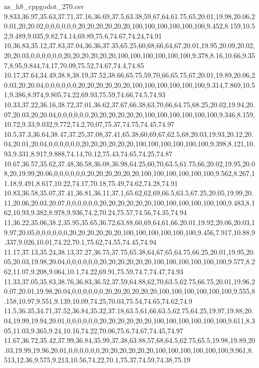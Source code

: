 \begin{filecontents*}[overwrite]{ns_h8_cppgodot_270.csv}
9.833,36.97,35.63,37.71,37.16,36.69,37.5,63.38,59,67,64,61.75,65,20.01,19.98,20.06,20.01,20,20.02,0,0,0,0,0,0,20,20,20,20,20,20,100,100,100,100,100,100,9.452,8.159,10.52,9.489,9.035,9.82,74.14,69.89,75.6,74.67,74.24,74.91
10,36.83,35.12,37.83,37.04,36.36,37.35,65.25,60,68,66,64,67,20.01,19.95,20.09,20.02,20,20.03,0,0,0,0,0,0,20,20,20,20,20,20,100,100,100,100,100,100,9.378,8.16,10.66,9.357,8.95,9.844,74.17,70.09,75.52,74.67,74.4,74.85
10.17,37.64,34.49,38.8,38.19,37.52,38.66,65.75,59,70,66,65.75,67,20.01,19.89,20.06,20.03,20,20.04,0,0,0,0,0,0,20,20,20,20,20,20,100,100,100,100,100,100,9.314,7.869,10.51,9.386,8.974,9.805,74.22,69.93,75.59,74.66,74.5,74.93
10.33,37.22,36.16,38.72,37.01,36.62,37.67,66.38,63,70,66,64.75,68.25,20.02,19.94,20.07,20.03,20,20.04,0,0,0,0,0,0,20,20,20,20,20,20,100,100,100,100,100,100,9.346,8.159,10.72,9.33,9.032,9.772,74.2,70.07,75.37,74.75,74.45,74.97
10.5,37.3,36.64,38.47,37.25,37.08,37.41,65.38,60,69,67,62.5,68,20.03,19.93,20.12,20.04,20.01,20.04,0,0,0,0,0,0,20,20,20,20,20,20,100,100,100,100,100,100,9.398,8.121,10.93,9.331,8.917,9.888,74.14,70.12,75.43,74.65,74.25,74.87
10.67,36.57,35.62,37.48,36.58,36.08,36.98,64.25,60,70,63.5,61.75,66,20.02,19.95,20.08,20,19.99,20.06,0,0,0,0,0,0,20,20,20,20,20,20,100,100,100,100,100,100,9.562,8.267,11.18,9.491,8.617,10.22,74.17,70.18,75.49,74.62,74.28,74.91
10.83,36.58,35.07,37.41,36.81,36.11,37.1,65.62,62,69,66.5,63.5,67.25,20.05,19.99,20.11,20.06,20.03,20.07,0,0,0,0,0,0,20,20,20,20,20,20,100,100,100,100,100,100,9.483,8.162,10.93,9.382,8.978,9.936,74.2,70.24,75.57,74.56,74.35,74.94
11,36.22,35.06,38.2,35.95,35.65,36.72,63.88,60,69,64,61,66,20.01,19.92,20.06,20.03,19.97,20.05,0,0,0,0,0,0,20,20,20,20,20,20,100,100,100,100,100,100,9.456,7.917,10.88,9.337,9.026,10.01,74.22,70.1,75.62,74.55,74.45,74.94
11.17,37.13,35.24,38.13,37.27,36.75,37.75,65.38,64,67,65,64.75,66.25,20.01,19.95,20.05,20.03,19.98,20.04,0,0,0,0,0,0,20,20,20,20,20,20,100,100,100,100,100,100,9.577,8.262,11.07,9.208,9.064,10.1,74.22,69.91,75.59,74.7,74.47,74.93
11.33,37.05,35.83,38.76,36.83,36.52,37.59,64.88,62,70,63.5,62.75,66.75,20.01,19.96,20.07,20.01,19.98,20.04,0,0,0,0,0,0,20,20,20,20,20,20,100,100,100,100,100,100,9.555,8.158,10.97,9.551,9.139,10.09,74.25,70.03,75.54,74.65,74.62,74.9
11.5,36.35,34.71,37.52,36.84,35.32,37.18,63.5,61,66,63.5,62.75,64.25,19.97,19.88,20.04,19.99,19.94,20.01,0,0,0,0,0,0,20,20,20,20,20,20,100,100,100,100,100,100,9.611,8.305,11.03,9.365,9.24,10.16,74.22,70.06,75.6,74.67,74.45,74.97
11.67,36.72,35.42,37.99,36.84,35.99,37.38,63.88,57,68,64.5,62.75,65.5,19.98,19.89,20.03,19.99,19.96,20.01,0,0,0,0,0,0,20,20,20,20,20,20,100,100,100,100,100,100,9.961,8.513,12.36,9.575,9.213,10.56,74.22,70.1,75.37,74.59,74.38,75.19

\end{filecontents*}
